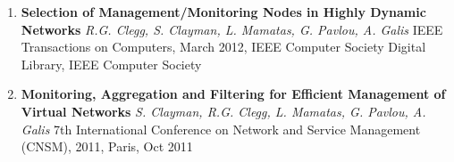 \begin{enumerate}
  \item
\textbf{Selection of Management/Monitoring Nodes in Highly Dynamic Networks}
\emph{R.G. Clegg, S. Clayman, L. Mamatas, G. Pavlou, A. Galis}
IEEE Transactions on Computers, March 2012, IEEE Computer Society Digital Library, IEEE Computer Society

  \item
\textbf{Monitoring, Aggregation and Filtering for Efficient Management of Virtual Networks}
\emph{S. Clayman, R.G. Clegg, L. Mamatas, G. Pavlou, A. Galis}
7th International Conference on Network and Service Management (CNSM), 2011, Paris, Oct 2011
\end{enumerate}
